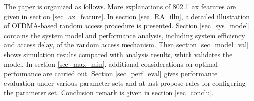The paper is organized as follows.
More explanations of 802.11ax features are given in section \ref{sec_ax_feature}. 
In section \ref{sec_RA_illu}, a detailed illustration of OFDMA-based random access procedure is presented.
Section \ref{sec_sys_model} contains the system model and performance analysis, including system efficiency and access delay, of the random access mechanism. 
Then section \ref{sec_model_val} shows simulation results compared with analysis results, which validates the model.
In section \ref{sec_max_min}, additional considerations on optimal performance are carried out. 
Section \ref{sec_perf_eval} gives performance evaluation under various parameter sets and at last propose rules for configuring the parameter set.
Conclusion remark is given in section \ref{sec_conclu}.

%
%
%
